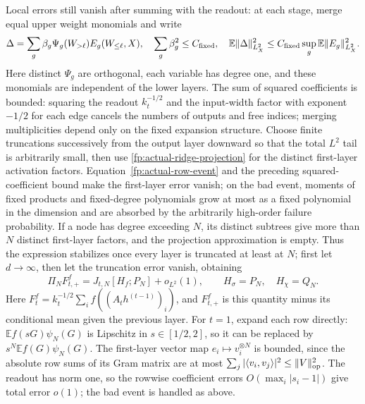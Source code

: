 \documentclass[a4paper]{tufte-handout}
\newcommand{\E}{\mathbb E}
\begin{document}
\begin{fullwidth}
Local errors still vanish after summing with the readout: at each stage, merge equal upper weight monomials and write
\begin{equation}\label{fp:actual-phase-bound}
 \Delta=\sum_g\beta_g\Psi_g(W_{>\ell})E_g(W_{\le\ell},X),
 \quad \sum_g\beta_g^2\le C_{\rm fixed},
 \quad \E\|\Delta\|_{L^2_X}^2
 \le C_{\rm fixed}\sup_g\E\|E_g\|_{L^2_X}^2.
\end{equation}
Here distinct $\Psi_g$ are orthogonal, each variable has degree one, and these monomials are independent of the lower layers.
The sum of squared coefficients is bounded: squaring the readout $k_t^{-1/2}$ and the input-width factor with exponent $-1/2$ for each edge
cancels the numbers of outputs and free indices; merging multiplicities depend only on the fixed expansion structure.
Choose finite truncations successively from the output layer downward so that the total $L^2$ tail is arbitrarily small, then use
\eqref{fp:actual-ridge-projection} for the distinct first-layer activation factors.
Equation~\eqref{fp:actual-row-event} and the preceding squared-coefficient bound make the first-layer error vanish;
on the bad event, moments of fixed products and fixed-degree polynomials grow at most as a fixed polynomial in the dimension and are absorbed by the arbitrarily high-order failure probability.
If a node has degree exceeding $N$, its distinct subtrees give more than $N$ distinct first-layer factors, and the projection approximation is empty.
Thus the expression stabilizes once every layer is truncated at least at $N$; first let $d\to\infty$, then let the truncation error vanish, obtaining
\begin{equation}\label{fp:actual-positive-local}
 \Pi_NF_{t,+}^f=J_{t,N}[H_f;P_N]+o_{L^2}(1),\qquad
 H_\sigma=P_N,\quad H_\chi=Q_N.
\end{equation}
Here $F_t^f=k_t^{-1/2}\sum_i f((A_th^{(t-1)})_i)$, and $F_{t,+}^f$ is this quantity minus its conditional mean given the previous layer.
For $t=1$, expand each row directly: $\E f(sG)\psi_N(G)$ is Lipschitz in $s\in[1/2,2]$,
so it can be replaced by $s^N\E f(G)\psi_N(G)$. The first-layer vector map $e_i\mapsto v_i^{\otimes N}$ is bounded,
since the absolute row sums of its Gram matrix are at most $\sum_j|\langle v_i,v_j\rangle|^2\le\|V\|_{\rm op}^2$.
The readout has norm one, so the rowwise coefficient errors $O(\max_i|s_i-1|)$ give total error $o(1)$; the bad event is handled as above.


\end{fullwidth}
\end{document}
